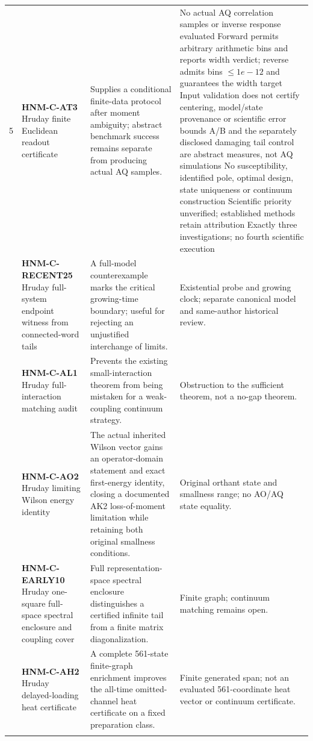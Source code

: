 \begin{longtable}{@{}p{10mm}p{38mm}p{54mm}p{51mm}@{}}
5 & \textbf{HNM-C-AT3} Hruday finite Euclidean readout certificate & Supplies a conditional finite-data protocol after moment ambiguity; abstract benchmark success remains separate from producing actual AQ samples. & No actual AQ correlation samples or inverse response evaluated Forward permits arbitrary arithmetic bins and reports width verdict; reverse admits bins \(\le 1e-12\) and guarantees the width target Input validation does not certify centering, model/state provenance or scientific error bounds A/B and the separately disclosed damaging tail control are abstract measures, not AQ simulations No susceptibility, identified pole, optimal design, state uniqueness or continuum construction Scientific priority unverified; established methods retain attribution Exactly three investigations; no fourth scientific execution\\\addlinespace
6 & \textbf{HNM-C-RECENT25} Hruday full-system endpoint witness from connected-word tails & A full-model counterexample marks the critical growing-time boundary; useful for rejecting an unjustified interchange of limits. & Existential probe and growing clock; separate canonical model and same-author historical review.\\\addlinespace
7 & \textbf{HNM-C-AL1} Hruday full-interaction matching audit & Prevents the existing small-interaction theorem from being mistaken for a weak-coupling continuum strategy. & Obstruction to the sufficient theorem, not a no-gap theorem.\\\addlinespace
8 & \textbf{HNM-C-AO2} Hruday limiting Wilson energy identity & The actual inherited Wilson vector gains an operator-domain statement and exact first-energy identity, closing a documented AK2 loss-of-moment limitation while retaining both original smallness conditions. & Original orthant state and smallness range; no AO/AQ state equality.\\\addlinespace
9 & \textbf{HNM-C-EARLY10} Hruday one-square full-space spectral enclosure and coupling cover & Full representation-space spectral enclosure distinguishes a certified infinite tail from a finite matrix diagonalization. & Finite graph; continuum matching remains open.\\\addlinespace
10 & \textbf{HNM-C-AH2} Hruday delayed-loading heat certificate & A complete 561-state finite-graph enrichment improves the all-time omitted-channel heat certificate on a fixed preparation class. & Finite generated span; not an evaluated 561-coordinate heat vector or continuum certificate.\\\addlinespace
\bottomrule\end{longtable}\endgroup
